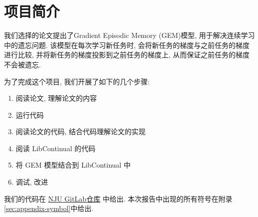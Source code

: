 \newpage
\section{项目简介}
我们选择的论文\cite{davidlopez-pazGradientEpisodicMemory2022}提出了Gradient Episodic Memory (GEM)模型, 用于解决连续学习中的遗忘问题. 该模型在每次学习新任务时, 会将新任务的梯度与之前任务的梯度进行比较, 并将新任务的梯度投影到之前任务的梯度上, 从而保证之前任务的梯度不会被遗忘.

为了完成这个项目, 我们开展了如下的几个步骤:
\begin{enumerate}[itemsep=-1mm]
    \item 阅读论文, 理解论文的内容
    \item 运行代码
    \item 阅读论文的代码, 结合代码理解论文的实现
    \item 阅读 LibContinual 的代码
    \item 将 GEM 模型结合到 LibContinual 中
    \item 调试, 改进
\end{enumerate}
我们的代码在 \href{https://git.nju.edu.cn/MLLab-2023/LibContinual/}{NJU GitLab仓库} 中给出.
本次报告中出现的所有符号在附录\ref{sec:appendix-symbol}中给出.